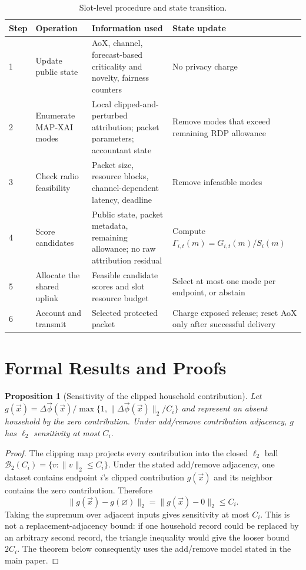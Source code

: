 \documentclass[10pt,conference]{IEEEtran}
\newtheorem{proposition}{Proposition}
\begin{document}
\begin{table}[htbp]
\caption{Slot-level procedure and state transition.}
\label{tab:procedure}
\centering\small
\begin{tabular}{p{}p{}p{}p{}}
\toprule
Step & Operation & Information used & State update\\ \midrule
1 & Update public state & AoX, channel, forecast-based criticality and novelty, fairness counters & No privacy charge\\
2 & Enumerate MAP-XAI modes & Local clipped-and-perturbed attribution; packet parameters; accountant state & Remove modes that exceed remaining RDP allowance\\
3 & Check radio feasibility & Packet size, resource blocks, channel-dependent latency, deadline & Remove infeasible modes\\
4 & Score candidates & Public state, packet metadata, remaining allowance; no raw attribution residual & Compute $\Gamma_{i,t}(m)=G_{i,t}(m)/S_i(m)$\\
5 & Allocate the shared uplink & Feasible candidate scores and slot resource budget & Select at most one mode per endpoint, or abstain\\
6 & Account and transmit & Selected protected packet & Charge exposed release; reset AoX only after successful delivery\\
\bottomrule
\end{tabular}
\end{table}

\section{Formal Results and Proofs}

\begin{proposition}[Sensitivity of the clipped household contribution]
Let
$g(\vec x)=\Delta\vec\phi(\vec x)/
\max\{1,\|\Delta\vec\phi(\vec x)\|_2/C_i\}$ and represent an absent
household by the zero contribution. Under add/remove contribution adjacency,
$g$ has $\ell_2$ sensitivity at most $C_i$.
\end{proposition}

\begin{proof}
The clipping map projects every contribution into the closed $\ell_2$ ball
$\mathcal B_2(C_i)=\{v:\|v\|_2\leq C_i\}$. Under the stated add/remove
adjacency, one dataset contains endpoint $i$'s clipped contribution $g(\vec x)$
and its neighbor contains the zero contribution. Therefore
\begin{equation}
\|g(\vec x)-g(\varnothing)\|_2
=\|g(\vec x)-0\|_2\leq C_i.
\end{equation}
Taking the supremum over adjacent inputs gives sensitivity at most $C_i$.
This is not a replacement-adjacency bound: if one household record could be
replaced by an arbitrary second record, the triangle inequality would give
the looser bound $2C_i$. The theorem below consequently uses the add/remove
model stated in the main paper.
\end{proof}
\end{document}
